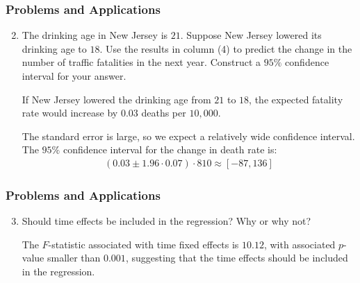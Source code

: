 \begin{frame}
\frametitle{Problems and Applications}

\begin{enumerate}\setcounter{enumi}{1}

\item The drinking age in New Jersey is $21$. Suppose New Jersey lowered its drinking age to $18$. Use the results in column (4) to predict the change in the number of traffic fatalities in the next year. Construct a $95\%$ confidence interval for your answer.

\begin{answer}
If New Jersey lowered the drinking age from $21$ to $18$, the expected fatality rate would increase by $0.03$ deaths per $10,000$. 

The standard error is large, so we expect a relatively wide confidence interval. The $95\%$ confidence interval for the change in death rate is:
\begin{align*}
(0.03 \pm 1.96 \cdot 0.07) \cdot 810 
\approx [-87, 136]
\end{align*}
\end{answer}

\end{enumerate}

\end{frame}


\begin{frame}
\frametitle{Problems and Applications}

\begin{enumerate}\setcounter{enumi}{2}

\item Should time effects be included in the regression? Why or why not?

\begin{answer}
The $F$-statistic associated with time fixed effects is $10.12$, with associated $p$-value smaller than $0.001$, suggesting that the time effects should be included in the regression.
\end{answer}

\end{enumerate}

\end{frame}


